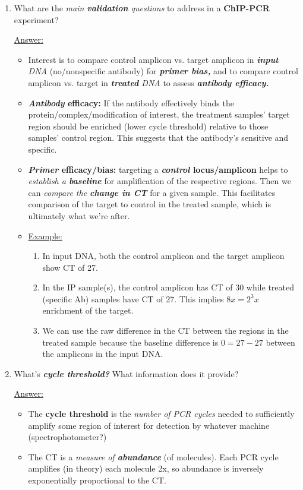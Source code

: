 \documentclass{article}
\newenvironment{QandA}{\begin{enumerate}[label=\bfseries Q\arabic*.]}
                       {\end{enumerate}}
\newenvironment{answered}{\par\normalfont\underline{Answer:}}{}
\begin{document}
\begin{QandA}
\begin{answered}
    \end{answered}
  \item{What are the \textit{main \textbf{validation} questions} to address in a \textbf{ChIP-PCR} experiment?}
    \begin{answered}
    \begin{itemize}
      \item{Interest is to compare control amplicon vs. target amplicon in \textit{\textbf{input} DNA} (no/nonspecific antibody) for \textbf{\textit{primer bias,}} and to compare control amplicon vs. target in \textit{\textbf{treated} DNA} to assess \textbf{\textit{antibody efficacy.}}}
      \item{\textbf{\textit{Antibody} efficacy:} If the antibody effectively binds the protein/complex/modification of interest, the treatment samples' target region should be enriched (lower cycle threshold) relative to those samples' control region. This suggests that the antibody's sensitive and specific.}
      \item{\textbf{\textit{Primer} efficacy/bias:} targeting a \textbf{\textit{control} locus/amplicon} helps to \textit{establish a \textbf{baseline}} for amplification of the respective regions. Then we can \textit{compare the \textbf{change in CT}} for a given sample. This facilitates comparison of the target to control in the treated sample, which is ultimately what we're after.}
      \item{\underline{Example:}}
      \begin{enumerate}
        \item{In input DNA, both the control amplicon and the target amplicon show CT of 27.}
        \item{In the IP sample(s), the control amplicon has CT of 30 while treated (specific Ab) samples have CT of 27. This implies $8x = 2^{3}x$ enrichment of the target.}
        \item{We can use the raw difference in the CT between the regions in the treated sample because the baseline difference is $0 = 27 - 27$ between the amplicons in the input DNA.}
      \end{enumerate}
    \end{itemize}
    \end{answered}
  \item{What's \textbf{\textit{cycle threshold?}} What information does it provide?}
    \begin{answered}
    \begin{itemize}
      \item{The \textbf{cycle threshold} is the \textit{number of PCR cycles} needed to sufficiently amplify some region of interest for detection by whatever machine (spectrophotometer?)}
      \item{The CT is a \textit{measure of \textbf{abundance}} (of molecules). Each PCR cycle amplifies (in theory) each molecule 2x, so abundance is inversely exponentially proportional to the CT.}
    \end{itemize}
    \end{answered}
\end{QandA}
\end{document}
